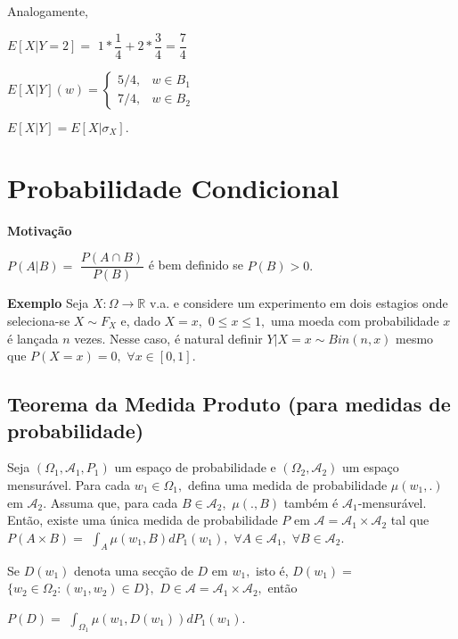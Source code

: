 \documentclass[
]{book}
\begin{document}
Analogamente,

\(E[X|Y=2]=\) \(1*\dfrac{1}{4}+2*\dfrac{3}{4}=\dfrac{7}{4}\)

\(E[X|Y](w)=\left\{\begin{array}{ll} 5/4, & w \in B_1\\ 7/4, & w \in B_2 \end{array}\right.\)

\(E[X|Y]=E[X|\sigma_X].\)

\hypertarget{probabilidade-condicional}{%
\section{Probabilidade Condicional}\label{probabilidade-condicional}}

\textbf{Motivação}

\(P(A|B)=\) \(\dfrac{P(A\cap B)}{P(B)}\) é bem definido se \(P(B)>0.\)

\textbf{Exemplo} Seja \(X: \Omega \longrightarrow \mathbb{R}\) v.a. e considere um experimento em dois estagios onde seleciona-se \(X\sim F_X\) e, dado \(X=x,\) \(0\leq x\leq 1,\) uma moeda com probabilidade \(x\) é lançada \(n\) vezes. Nesse caso, é natural definir \(Y|X=x\sim Bin(n,x)\) mesmo que \(P(X=x)=0,\) \(\forall x \in [0,1].\)

\hypertarget{teorema-da-medida-produto-para-medidas-de-probabilidade}{%
\subsection{Teorema da Medida Produto (para medidas de probabilidade)}\label{teorema-da-medida-produto-para-medidas-de-probabilidade}}

Seja \((\Omega_1, \mathcal{A}_1,P_1)\) um espaço de probabilidade e \((\Omega_2,\mathcal{A}_2)\) um espaço mensurável. Para cada \(w_1 \in \Omega_1,\) defina uma medida de probabilidade \(\mu(w_1,.)\) em \(\mathcal{A}_2.\) Assuma que, para cada \(B \in \mathcal{A}_2,\) \(\mu(.,B)\) também é \(\mathcal{A}_1\)-mensurável. Então, existe uma única medida de probabilidade \(P\) em \(\mathcal{A}=\mathcal{A}_1\times \mathcal{A}_2\) tal que \(P(A\times B)=\) \(\int_A \mu(w_1,B)dP_1(w_1),\) \(\forall A\in \mathcal{A}_1,\) \(\forall B\in \mathcal{A}_2.\)

Se \(D(w_1)\) denota uma secção de \(D\) em \(w_1,\) isto é, \(D(w_1)=\) \(\{w_2\in \Omega_2: (w_1,w_2)\in D\},\) \(D\in \mathcal{A}=\mathcal{A}_1\times\mathcal{A}_2,\) então

\(P(D)=\) \(\int_{\Omega_1} \mu(w_1,D(w_1))dP_1(w_1).\)
\end{document}
